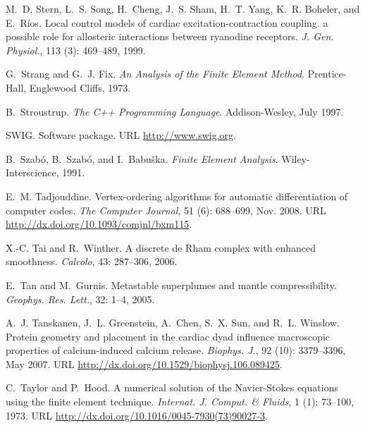 \begin{thebibliography}{467}
M.~D. Stern, L.~S. Song, H.~Cheng, J.~S. Sham, H.~T. Yang, K.~R. Boheler, and
  E.~R\'{i}os.
\newblock Local control models of cardiac excitation-contraction coupling. a
  possible role for allosteric interactions between ryanodine receptors.
\newblock \emph{J. Gen. Physiol.}, 113 (3): 469--489, 1999.

G.~Strang and G.~J. Fix.
\newblock \emph{An Analysis of the Finite Element Method}.
\newblock Prentice-Hall, Englewood Cliffs, 1973.

B.~Stroustrup.
\newblock \emph{The {C++} Programming Language}.
\newblock Addison-Wesley, July 1997.

SWIG.
\newblock Software package.
\newblock URL \url{http://www.swig.org}.

B.~Szab{\'o}, B.~Szab{\'o}, and I.~Babu\v{s}ka.
\newblock \emph{Finite Element Analysis}.
\newblock Wiley-Interscience, 1991.

E.~M. Tadjouddine.
\newblock Vertex-ordering algorithms for automatic differentiation of computer
  codes.
\newblock \emph{The Computer Journal}, 51 (6): 688--699, Nov.
  2008.
\newblock URL \url{http://dx.doi.org/10.1093/comjnl/bxm115}.

X.-C. Tai and R.~Winther.
\newblock A discrete de {R}ham complex with enhanced smoothness.
\newblock \emph{Calcolo}, 43: 287--306, 2006.

E.~Tan and M.~Gurnis.
\newblock Metastable superplumes and mantle compressibility.
\newblock \emph{Geophys. Res. Lett.}, 32: 1--4, 2005.

A.~J. Tanskanen, J.~L. Greenstein, A.~Chen, S.~X. Sun, and R.~L. Winslow.
\newblock Protein geometry and placement in the cardiac dyad influence
  macroscopic properties of calcium-induced calcium release.
\newblock \emph{Biophys. J.}, 92 (10): 3379--3396, May 2007.
\newblock URL \url{http://dx.doi.org/10.1529/biophysj.106.089425}.

C.~Taylor and P.~Hood.
\newblock A numerical solution of the {N}avier-{S}tokes equations using the
  finite element technique.
\newblock \emph{Internat. J. Comput. \& Fluids}, 1 (1):
  73--100, 1973.
\newblock URL \url{http://dx.doi.org/10.1016/0045-7930(73)90027-3}.


\end{thebibliography}
